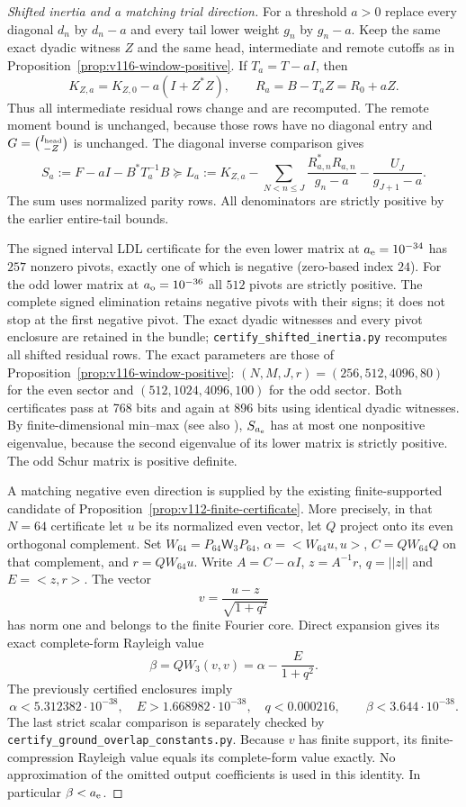 \documentclass[11pt]{article}
\def\norm#1{||#1||}%
\def\ip#1#2{<#1,#2>}%
\theoremstyle{remark}
\newcommand{\norm}[1]{\left\lVert #1\right\rVert}
\newcommand{\ip}[2]{\left\langle #1,#2\right\rangle}
\begin{document}
\begin{proof}[Shifted inertia and a matching trial direction]
For a threshold $a>0$ replace every diagonal $d_n$ by $d_n-a$ and
every tail lower weight $g_n$ by $g_n-a$.  Keep the same exact dyadic
witness $Z$ and the same head, intermediate and remote cutoffs as in
Proposition~\ref{prop:v116-window-positive}.  If $T_a=T-aI$, then
\[
 K_{Z,a}=K_{Z,0}-a(I+Z^*Z),\qquad
 R_a=B-T_aZ=R_0+aZ.
\]
Thus all intermediate residual rows change and are recomputed.  The
remote moment bound is unchanged, because those rows have no diagonal
entry and $G=\binom{I_{\rm head}}{-Z}$ is unchanged.  The diagonal inverse comparison gives
\[
 S_a:=F-aI-B^*T_a^{-1}B\succeq
 L_a:=K_{Z,a}-\sum_{N<n\le J}\frac{R_{a,n}^*R_{a,n}}{g_n-a}
                      -\frac{U_J}{g_{J+1}-a}.
\]
The sum uses normalized parity rows.  All denominators are strictly
positive by the earlier entire-tail bounds.

The signed interval LDL certificate for the even lower matrix at
$a_{\rm e}=10^{-34}$ has $257$ nonzero pivots, exactly one of which
is negative (zero-based index $24$).  For the odd lower matrix at
$a_{\rm o}=10^{-36}$ all $512$ pivots are strictly positive.
The complete signed elimination retains negative pivots with their
signs; it does not stop at the first negative pivot.  The exact dyadic
witnesses and every pivot enclosure are retained in the bundle;
\texttt{certify\_shifted\_inertia.py} recomputes all shifted residual rows.
The exact parameters are those of Proposition~\ref{prop:v116-window-positive}:
$(N,M,J,r)=(256,512,4096,80)$ for the even sector and
$(512,1024,4096,100)$ for the odd sector. Both certificates pass
at 768 bits and again at 896 bits using identical dyadic witnesses.
By finite-dimensional min--max (see also \cite[Section~4.3]{Teschl2009}), $S_{a_{\rm e}}$ has at most one
nonpositive eigenvalue, because the second eigenvalue of its lower
matrix is strictly positive.  The odd Schur matrix is positive definite.

A matching negative even direction is supplied by the existing
finite-supported candidate of
Proposition~\ref{prop:v112-finite-certificate}. More precisely, in that
$N=64$ certificate let $u$ be its normalized even vector, let $Q$ project
onto its even orthogonal complement. Set
$W_{64}=P_{64}\mathsf W_3P_{64}$, $\alpha=\ip{W_{64}u}{u}$,
$C=QW_{64}Q$ on that complement, and $r=QW_{64}u$. Write $A=C-\alpha I$, $z=A^{-1}r$, $q=\norm z$ and
$E=\ip zr$.  The vector
\[
 v=\frac{u-z}{\sqrt{1+q^2}}
\]
has norm one and belongs to the finite Fourier core.  Direct expansion
gives its exact complete-form Rayleigh value
\[
 \beta=QW_3(v,v)=\alpha-\frac{E}{1+q^2}.
\]
The previously certified enclosures imply
\[
 \alpha<5.312382\cdot10^{-38},\quad
 E>1.668982\cdot10^{-38},\quad q<0.000216,
 \qquad \beta<3.644\cdot10^{-38}.
\]
The last strict scalar comparison is separately checked by
\texttt{certify\_ground\_overlap\_constants.py}.  Because $v$ has
finite support, its finite-compression Rayleigh value equals its
complete-form value exactly.  No approximation of the omitted output
coefficients is used in this identity.  In particular $\beta<a_{\rm e}$.


\end{proof}
\end{document}

